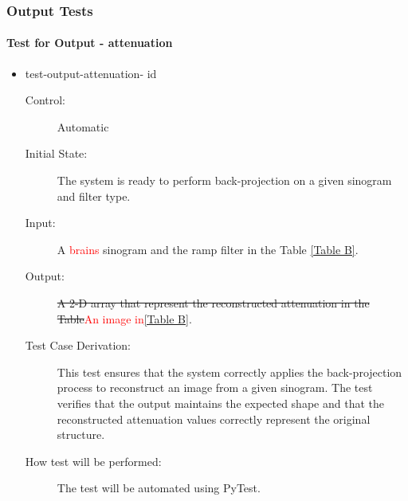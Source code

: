 \documentclass[12pt, titlepage]{article}
\newcounter{testnum}
\newcommand{\dthetestnum}{id\thetestnum}
\newcommand{\add}{\textcolor{red}}
\begin{document}
\subsubsection{Output Tests}\label{output_test}
\paragraph{Test for Output - attenuation}
\begin{itemize}
\item{test-output-attenuation- \label{id5} \dthetestnum}
\begin{description}
\item[Control:] Automatic

\item[Initial State:] The system is ready to perform back-projection on a given
  sinogram and filter type.

\item[Input:] A \add{brains} sinogram and the ramp filter in the Table \ref{Table B}.

\item[Output:] \st{A 2-D array that represent the reconstructed attenuation in the
  Table}\add{An image in}\ref{Table B}.

\item[Test Case Derivation:] This test ensures that the system correctly applies the back-projection process to reconstruct an image from a given sinogram. The test verifies that the output maintains the expected shape and that the reconstructed attenuation values correctly represent the original structure.

\item[How test will be performed:] The test will be automated using PyTest.
\end{description}
\end{itemize}
\end{document}
